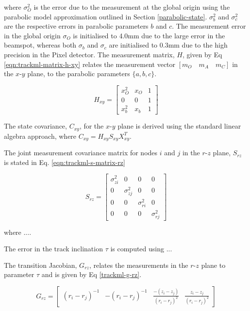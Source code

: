 where $\sigma_O^{2}$ is the error due to the measurement at the global origin using the parabolic model approximation outlined in Section \ref{parabolic-state}. $\sigma_b^{2}$ and $\sigma_c^{2}$ are the respective errors in parabolic parameters $b$ and $c$. The measurement error in the global origin $\sigma_O$ is initialised to 4.0mm due to the large error in the beamspot, whereas both $\sigma_b$ and $\sigma_c$ are initialised to 0.3mm due to the high precision in the Pixel detector. The measurement matrix, $H$, given by Eq \eqref{eqn:trackml-matrix-h-xy} relates the measurement vector $[m_O \quad m_A \quad m_C]$ in the $x$-$y$ plane, to the parabolic parameters $\{a, b, c \}$.

\begin{equation}
    H_{xy} = \begin{bmatrix} x_O^{2} & x_O & 1 \\ 0 & 0 & 1 \\ x_b^{2} & x_b & 1 \end{bmatrix} 
    \label{eqn:trackml-matrix-h-xy}
\end{equation}


The state covariance, $C_{xy}$, for the $x$-$y$ plane is derived using the standard linear algebra approach, where $C_{xy} = H_{xy}S_{xy}X_{xy}^T$.


The joint measurement covariance matrix for nodes $i$ and $j$ in the $r$-$z$ plane, $S_{rz}$ is stated in Eq. \eqref{eqn:trackml-s-matrix-rz}

\begin{equation}
    S_{rz} = \begin{bmatrix} \sigma_{zi}^{2} & 0 & 0 & 0 \\ 
                             0 & \sigma_{zj}^{2} & 0 & 0 \\ 
                             0 & 0 & \sigma_{ri}^{2} & 0 \\
                             0 & 0 & 0 & \sigma_{rj}^{2}
                            \end{bmatrix} 
    \label{eqn:trackml-s-matrix-rz}
\end{equation}


where .... 


The error in the track inclination $\tau$ is computed using ...

The transition Jacobian, $G_{rz}$, relates the measurements in the $r$-$z$ plane to parameter $\tau$ and is given by Eq \eqref{trackml-g-rz}.

\begin{equation}
    G_{rz} = \begin{bmatrix} 
            (r_i - r_j)^{-1} &
            -(r_i - r_j)^{-1} & 
            \frac{-(z_i - z_j)}{(r_i - r_j)^2} & 
            \frac{z_i - z_j}{(r_i - r_j)^2}
            \end{bmatrix} 
    \label{trackml-g-rz}
\end{equation}

